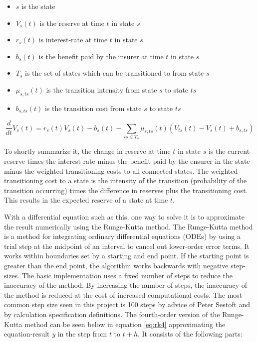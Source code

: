 \begin{itemize}
\item $s$ is the state
\item $V_s(t)$ is the reserve at time $t$ in state $s$
\item $r_s(t)$ is interest-rate at time $t$ in state $s$
\item $b_s(t)$ is the benefit paid by the insurer at time $t$ in state $s$
\item $T_s$ is the set of states which can be transitioned to from state $s$
\item $\mu_{s,ts}(t)$ is the transition intensity from state $s$ to state $ts$
\item $b_{s,ts}(t)$ is the transition cost from state $s$ to state $ts$
\end{itemize}

\begin{equation}\label{eq:thiele}
\frac{d}{dt}V_s(t) = r_s(t) V_s(t) - b_s(t) - \sum_{ts \in T_{s}} \mu_{s,ts}(t) (V_{ts}(t) - V_s(t) + b_{s,ts})
\end{equation}

To shortly summarize it, the change in reserve at time $t$ in state $s$ is the current reserve times the interest-rate minus the benefit paid by the ensurer in the state minus the weighted transitioning costs to all connected states. 
The weighted transitioning cost to a state is the intensity of the transition (probability of the transition occurring) times the difference in reserves plus the transitioning cost.
This results in the expected reserve of a state at time $t$.

With a differential equation such as this, one way to solve it is to approximate the result numerically using the Runge-Kutta method\cite{press2007numerical}.
The Runge-Kutta method is a method for integrating ordinary differential equations (ODEs) by using a trial step at the midpoint of an interval to cancel out lower-order error terms.
It works within boundaries set by a starting and end point. 
If the starting point is greater than the end point, the algorithm works backwards with negative step-sizes.
The basic implementation uses a fixed number of steps to reduce the inaccuracy of the method. 
By increasing the number of steps, the inaccuracy of the method is reduced at the cost of increased computational costs.
The most common step size seen in this project is 100 steps by advice of Peter Sestoft and by calculation specification definitions.
The fourth-order version of the Runge-Kutta method can be seen below in equation \ref{eq:rk4} approximating the equation-result $y$ in the step from $t$ to $t+h$. It consists of the following parts:

